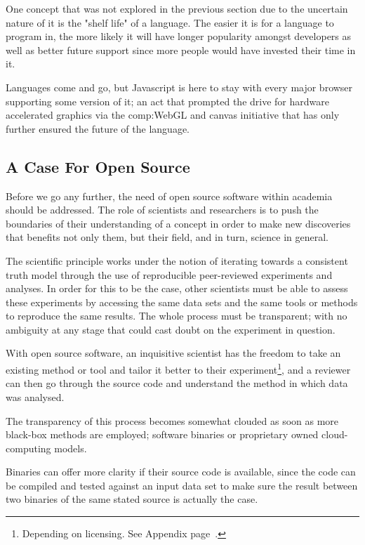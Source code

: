 One concept that was not explored in the previous section due to the uncertain nature of it is the "shelf life" of a language. The easier it is for a language to program in, the more likely it will have longer popularity amongst  developers as well as better future support since more people would have invested their time in it. 

Languages come and go, but Javascript is here to stay with every major browser supporting some version of it; an act that prompted the drive for hardware accelerated graphics via the \gls{comp:WebGL} and canvas initiative that has only further ensured the future of the language.


\subsection{A Case For Open Source}


Before we go any further, the need of open source software within academia should be addressed. The role of scientists and researchers is to push the boundaries of their understanding of a concept in order to make new discoveries that benefits not only them, but their field, and in turn, science in general. 

The scientific principle works under the notion of iterating towards a consistent truth model through the use of reproducible peer-reviewed experiments and analyses.  In order for this to be the case, other scientists must be able to assess these experiments by accessing the same data sets and the same tools or methods to reproduce the same results. The whole process must be transparent; with no ambiguity at any stage that could cast doubt on the experiment in question.

With open source software, an inquisitive scientist has the freedom to take an existing method or tool and tailor it better to their experiment\footnote{Depending on licensing. See Appendix page~\pageref{ref:app:licensing}.}, and a reviewer can then go through the source code and understand the method in which data was analysed.

The transparency of this process becomes somewhat clouded as soon as more black-box methods are employed; software binaries or proprietary owned cloud-computing models.

Binaries can offer more clarity if their source code is available, since the code can be compiled and tested against an input data set to make sure the result between two binaries of the same stated source is actually the case.

